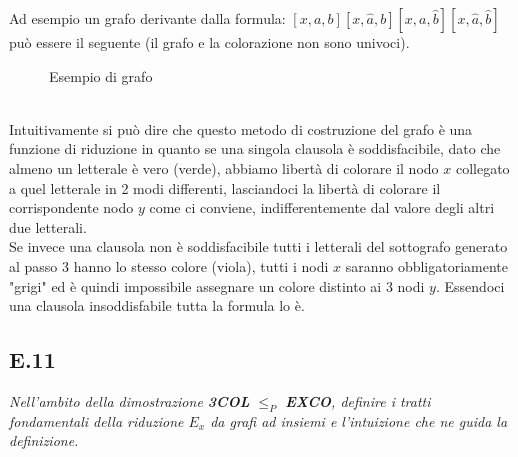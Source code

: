 \documentclass[a4paper]{article}
\begin{document}
\newpage
Ad esempio un grafo derivante dalla formula: $[x,a,b][x,\hat a, b][x,a,\hat b][x, \hat a, \hat b]$ può essere il seguente (il grafo e la colorazione non sono univoci).
		\begin{figure}[!ht]
		\centering
		\caption{Esempio di grafo} \label{FIG:E10_finale}
		\end{figure}\\
Intuitivamente si può dire che questo metodo di costruzione del grafo è una funzione di riduzione in quanto se una singola clausola è soddisfacibile, dato che almeno un letterale è vero (verde), abbiamo libertà di colorare il nodo $x$ collegato a quel letterale in 2 modi differenti, lasciandoci la libertà di colorare il corrispondente nodo $y$ come ci conviene, indifferentemente dal valore degli altri due letterali.\\
Se invece una clausola non è soddisfacibile tutti i letterali del sottografo generato al passo 3 hanno lo stesso colore (viola), tutti i nodi $x$ saranno obbligatoriamente "grigi" ed è quindi impossibile assegnare un colore distinto ai 3 nodi $y$.
Essendoci una clausola insoddisfabile tutta la formula lo è.
\subsection{E.11}
\emph{Nell’ambito della dimostrazione \textbf{3COL} $\leq_P$ \textbf{EXCO}, definire i tratti fondamentali della riduzione $E_x$ da grafi ad insiemi e l’intuizione che ne guida la definizione.}
\end{document}

